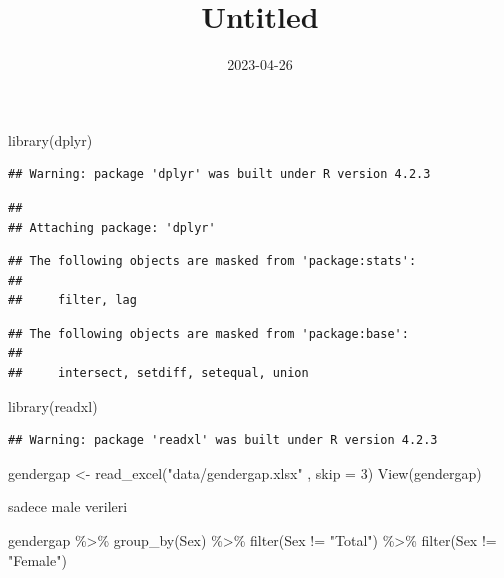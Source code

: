 \documentclass[
]{article}
\title{Untitled}
\author{}
\date{\vspace{-2.5em}2023-04-26}
\newenvironment{Shaded}{\begin{snugshade}}{\end{snugshade}}
\newcommand{\AttributeTok}[1]{\textcolor[rgb]{0.77,0.63,0.00}{#1}}
\newcommand{\DecValTok}[1]{\textcolor[rgb]{0.00,0.00,0.81}{#1}}
\newcommand{\FunctionTok}[1]{\textcolor[rgb]{0.00,0.00,0.00}{#1}}
\newcommand{\NormalTok}[1]{#1}
\newcommand{\OtherTok}[1]{\textcolor[rgb]{0.56,0.35,0.01}{#1}}
\newcommand{\SpecialCharTok}[1]{\textcolor[rgb]{0.00,0.00,0.00}{#1}}
\newcommand{\StringTok}[1]{\textcolor[rgb]{0.31,0.60,0.02}{#1}}
\begin{document}
\maketitle

\begin{Shaded}
\begin{Highlighting}[]
\FunctionTok{library}\NormalTok{(dplyr)}
\end{Highlighting}
\end{Shaded}

\begin{verbatim}
## Warning: package 'dplyr' was built under R version 4.2.3
\end{verbatim}

\begin{verbatim}
## 
## Attaching package: 'dplyr'
\end{verbatim}

\begin{verbatim}
## The following objects are masked from 'package:stats':
## 
##     filter, lag
\end{verbatim}

\begin{verbatim}
## The following objects are masked from 'package:base':
## 
##     intersect, setdiff, setequal, union
\end{verbatim}

\begin{Shaded}
\begin{Highlighting}[]
\FunctionTok{library}\NormalTok{(readxl)}
\end{Highlighting}
\end{Shaded}

\begin{verbatim}
## Warning: package 'readxl' was built under R version 4.2.3
\end{verbatim}

\begin{Shaded}
\begin{Highlighting}[]
\NormalTok{gendergap }\OtherTok{\textless{}{-}} \FunctionTok{read\_excel}\NormalTok{(}\StringTok{"data/gendergap.xlsx"}\NormalTok{ , }\AttributeTok{skip =} \DecValTok{3}\NormalTok{)}
\FunctionTok{View}\NormalTok{(gendergap)}
\end{Highlighting}
\end{Shaded}

sadece male verileri

\begin{Shaded}
\begin{Highlighting}[]
\NormalTok{gendergap }\SpecialCharTok{\%\textgreater{}\%}
\FunctionTok{group\_by}\NormalTok{(Sex) }\SpecialCharTok{\%\textgreater{}\%}
  \FunctionTok{filter}\NormalTok{(Sex }\SpecialCharTok{!=} \StringTok{"Total"}\NormalTok{) }\SpecialCharTok{\%\textgreater{}\%}
\FunctionTok{filter}\NormalTok{(Sex }\SpecialCharTok{!=} \StringTok{"Female"}\NormalTok{)}
\end{Highlighting}
\end{Shaded}
\end{document}
